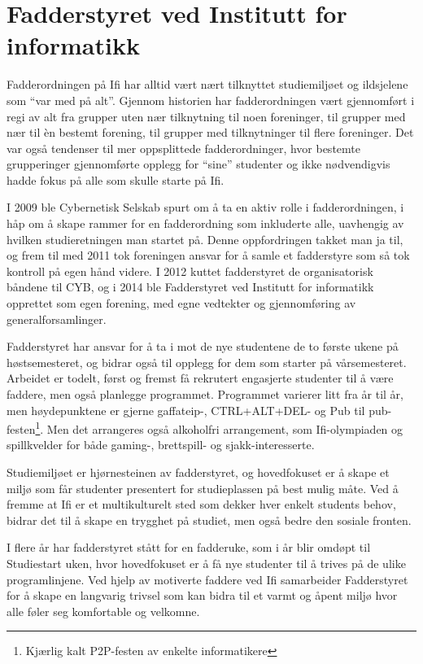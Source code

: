 \chapter{Fadderstyret ved Institutt for informatikk}

\author{Skrevet av Thao Tran, leder for Fadderstyret ved Institutt for informatikk, og Arne Hassel}

Fadderordningen på Ifi har alltid vært nært tilknyttet studiemiljøet og ildsjelene som ``var med på alt''. Gjennom historien har fadderordningen vært gjennomført i regi av alt fra grupper uten nær tilknytning til noen foreninger, til grupper med nær til èn bestemt forening, til grupper med tilknytninger til flere foreninger. Det var også tendenser til mer oppsplittede fadderordninger, hvor bestemte grupperinger gjennomførte opplegg for ``sine'' studenter og ikke nødvendigvis hadde fokus på alle som skulle starte på Ifi.

I 2009 ble Cybernetisk Selskab spurt om å ta en aktiv rolle i fadderordningen, i håp om å skape rammer for en fadderordning som inkluderte alle, uavhengig av hvilken studieretningen man startet på. Denne oppfordringen takket man ja til, og frem til med 2011 tok foreningen ansvar for å samle et fadderstyre som så tok kontroll på egen hånd videre. I 2012 kuttet fadderstyret de organisatorisk båndene til CYB, og i 2014 ble Fadderstyret ved Institutt for informatikk opprettet som egen forening, med egne vedtekter og gjennomføring av generalforsamlinger.

Fadderstyret har ansvar for å ta i mot de nye studentene de to første ukene på høstsemesteret, og bidrar også til opplegg for dem som starter på vårsemesteret. Arbeidet er todelt, først og fremst få rekrutert engasjerte studenter til å være faddere, men også planlegge programmet. Programmet varierer litt fra år til år, men høydepunktene er gjerne gaffateip-, CTRL+ALT+DEL- og Pub til pub-festen\footnote{Kjærlig kalt P2P-festen av enkelte informatikere}. Men det arrangeres også alkoholfri arrangement, som Ifi-olympiaden og spillkvelder for både gaming-, brettspill- og sjakk-interesserte.

Studiemiljøet er hjørnesteinen av fadderstyret, og hovedfokuset er å skape et miljø som får studenter presentert for studieplassen på best mulig måte. Ved å fremme at Ifi er et multikulturelt sted som dekker hver enkelt students behov, bidrar det til å skape en trygghet på studiet, men også bedre den sosiale fronten.

I flere år har fadderstyret stått for en fadderuke, som i år blir omdøpt til Studiestart uken, hvor hovedfokuset er å få nye studenter til å trives på de ulike programlinjene. Ved hjelp av motiverte faddere ved Ifi samarbeider Fadderstyret for å skape en langvarig trivsel som kan bidra til et varmt og åpent miljø hvor alle føler seg komfortable og velkomne.
